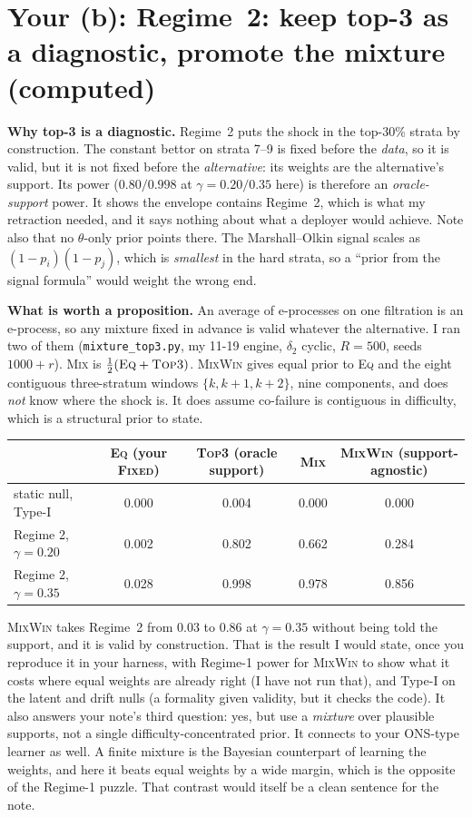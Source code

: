 \documentclass[11pt]{article}
\begin{document}
\section{Your (b): Regime~2: keep top-3 as a diagnostic, promote the mixture (computed)}
\textbf{Why top-3 is a diagnostic.} Regime~2 puts the shock in the top-30\% strata by construction. The constant bettor on strata 7--9 is fixed before the \emph{data}, so it is valid, but it is not fixed before the \emph{alternative}: its weights are the alternative's support.
Its power ($0.80/0.998$ at $\gamma=0.20/0.35$ here) is therefore an \emph{oracle-support} power. It shows the envelope contains Regime~2, which is what my retraction needed, and it says nothing about what a deployer would achieve.
Note also that no $\theta$-only prior points there. The Marshall--Olkin signal scales as $(1-p_i)(1-p_j)$, which is \emph{smallest} in the hard strata, so a ``prior from the signal formula'' would weight the wrong end.

\textbf{What is worth a proposition.} An average of e-processes on one filtration is an e-process, so any mixture fixed in advance is valid whatever the alternative. I ran two of them (\texttt{mixture\_top3.py}, my 11-19 engine, $\delta_2$ cyclic, $R=500$, seeds $1000+r$).
\textsc{Mix} is $\tfrac12(\textsc{Eq}+\textsc{Top3})$. \textsc{MixWin} gives equal prior to \textsc{Eq} and the eight contiguous three-stratum windows $\{k,k+1,k+2\}$, nine components, and does \emph{not} know where the shock is. It does assume co-failure is contiguous in difficulty, which is a structural prior to state.
\begin{center}\small
\begin{tabular}{lcccc}
\toprule
& \textsc{Eq} (your \textsc{Fixed}) & \textsc{Top3} (oracle support) & \textsc{Mix} & \textsc{MixWin} (support-agnostic)\\
\midrule
static null, Type-I & 0.000 & 0.004 & 0.000 & 0.000\\
Regime 2, $\gamma=0.20$ & 0.002 & 0.802 & 0.662 & 0.284\\
Regime 2, $\gamma=0.35$ & 0.028 & 0.998 & 0.978 & 0.856\\
\bottomrule
\end{tabular}
\end{center}
\textsc{MixWin} takes Regime~2 from $0.03$ to $0.86$ at $\gamma=0.35$ without being told the support, and it is valid by construction.
That is the result I would state, once you reproduce it in your harness, with Regime-1 power for \textsc{MixWin} to show what it costs where equal weights are already right (I have not run that), and Type-I on the latent and drift nulls (a formality given validity, but it checks the code).
It also answers your note's third question: yes, but use a \emph{mixture} over plausible supports, not a single difficulty-concentrated prior.
It connects to your ONS-type learner as well. A finite mixture is the Bayesian counterpart of learning the weights, and here it beats equal weights by a wide margin, which is the opposite of the Regime-1 puzzle. That contrast would itself be a clean sentence for the note.
\end{document}

